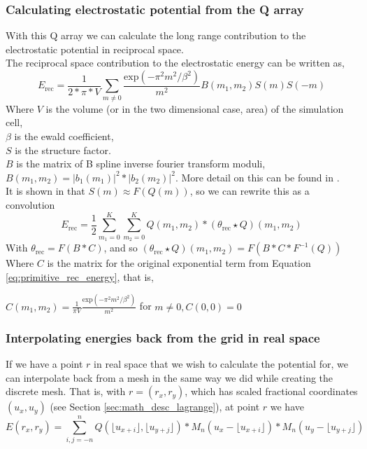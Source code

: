 \documentclass[pdftex,twoside,a4paper]{report}
\newcommand{\bcen}{\begin{center}}
\newcommand{\ecen}{\end{center}}
\begin{document}
\subsubsection{Calculating electrostatic potential from the Q array}
With this Q array we can calculate the long range contribution to the electrostatic potential in reciprocal space.\\
The reciprocal space contribution to the electrostatic energy can be written as,\\
\begin{equation}
E_{\text{rec}} = \frac{1}{2*\pi*V} \sum_{m \not= 0} \frac{\text{exp}(- \pi^2 m^2 / \beta^2)}{m^2} B(m_1,m_2) S(m) S(-m)
  \label{eq:primitive_rec_energy} \end{equation}
Where $V$ is the volume (or in the two dimensional case, area) of the simulation cell,\\
$\beta$ is the ewald coefficient,\\
$S$ is the structure factor.\\
$B$ is the matrix of B spline inverse fourier transform moduli, $B(m_1,m_2) = |b_1(m_1)|^2 * |b_2(m_2)|^2$. More detail on this can be found in \cite{essmann:8577}.\\
It is shown in \cite{essmann:8577} that $S(m) \approx F(Q(m))$, so we can rewrite this as a convolution\\
\begin{equation}
E_{\text{rec}} = \frac{1}{2} \sum_{m_1 = 0}^K \sum_{m_2 = 0}^K Q(m_1,m_2) * (\theta_{\text{rec}} \star Q)(m_1,m_2)
\label{eq:energy_rec}
\end{equation}
With $\theta_{\text{rec}} = F(B * C)$, and so $(\theta_{\text{rec}} \star Q)(m_1,m_2) = F(B * C * F^{-1}(Q))$ \cite{essmann:8577} \cite{lee05}\\
Where $C$ is the matrix for the original exponential term from Equation \ref{eq:primitive_rec_energy}, that is,
 \bcen$\displaystyle
C(m_1,m_2) = \frac{1}{\pi V} \frac{\text{exp}(- \pi^2 m^2 / \beta^2)}{m^2} $ for $ m \not= 0, C(0,0) = 0
$\ecen 

\subsubsection{Interpolating energies back from the grid in real space}
\label{sec:interpolate_from_grid}
If we have a point $r$ in real space that we wish to calculate the potential for, we can interpolate back from a mesh in the same way we did while creating the discrete mesh.
That is, with $r = (r_x,r_y)$, which has scaled fractional coordinates $(u_x,u_y)$ (see Section \ref{sec:math_desc_lagrange}), at point $r$ we have\\
\begin{equation}
\label{eq:interpoalte_from_grid}
E(r_x,r_y) = \sum _{i,j = -n} ^{n} Q(\lfloor u_{x+i} \rfloor,\lfloor u_{y+j} \rfloor) * M_n(u_x - \lfloor u_{x+i} \rfloor) * M_n(u_y - \lfloor u_{y+j} \rfloor)
\end{equation}
\end{document}
